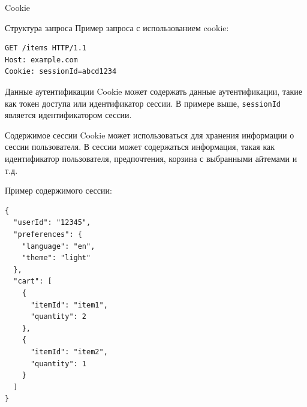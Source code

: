\documentclass[
  ignorenonframetext,
  aspectratio=169,
  aspectratio=169]{beamer}
\newcommand{\passthrough}[1]{#1}
\begin{document}
\begin{frame}[fragile]{Cookie}
\protect\hypertarget{cookie}{}
\begin{block}{Структура запроса}
\protect\hypertarget{ux441ux442ux440ux443ux43aux442ux443ux440ux430-ux437ux430ux43fux440ux43eux441ux430}{}
Пример запроса с использованием cookie:

\begin{lstlisting}
GET /items HTTP/1.1
Host: example.com
Cookie: sessionId=abcd1234
\end{lstlisting}
\end{block}

\begin{block}{Данные аутентификации}
\protect\hypertarget{ux434ux430ux43dux43dux44bux435-ux430ux443ux442ux435ux43dux442ux438ux444ux438ux43aux430ux446ux438ux438}{}
Cookie может содержать данные аутентификации, такие как токен доступа
или идентификатор сессии. В примере выше,
\passthrough{\lstinline!sessionId!} является идентификатором сессии.
\end{block}

\begin{block}{Содержимое сессии}
\protect\hypertarget{ux441ux43eux434ux435ux440ux436ux438ux43cux43eux435-ux441ux435ux441ux441ux438ux438}{}
Cookie может использоваться для хранения информации о сессии
пользователя. В сессии может содержаться информация, такая как
идентификатор пользователя, предпочтения, корзина с выбранными айтемами
и т.д.

Пример содержимого сессии:

\begin{lstlisting}
{
  "userId": "12345",
  "preferences": {
    "language": "en",
    "theme": "light"
  },
  "cart": [
    {
      "itemId": "item1",
      "quantity": 2
    },
    {
      "itemId": "item2",
      "quantity": 1
    }
  ]
}
\end{lstlisting}
\end{block}
\end{frame}
\end{document}
